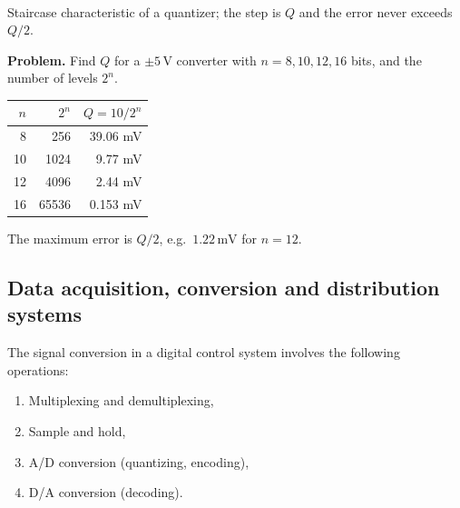\begin{center}
\\[2pt]
{\small Staircase characteristic of a quantizer; the step is $Q$ and the error never exceeds $Q/2$.}
\end{center}

\begin{addsol}
\textbf{Problem.} Find $Q$ for a $\pm5\,\mathrm{V}$ converter with $n=8,10,12,16$ bits, and the number of
levels $2^n$.

\medskip
\begin{center}
\begin{tabular}{@{}rrr@{}}\toprule
$n$ & $2^n$ & $Q=10/2^n$ \\ \midrule
8  & 256    & 39.06 mV \\
10 & 1024   & 9.77 mV \\
12 & 4096   & 2.44 mV \\
16 & 65536  & 0.153 mV \\ \bottomrule
\end{tabular}
\end{center}
The maximum error is $Q/2$, e.g.\ $1.22\,\mathrm{mV}$ for $n=12$.
\end{addsol}

\subsection{Data acquisition, conversion and distribution systems}
The signal conversion in a digital control system involves the following operations:
\begin{enumerate}
  \item Multiplexing and demultiplexing,
  \item Sample and hold,
  \item A/D conversion (quantizing, encoding),
  \item D/A conversion (decoding).
\end{enumerate}

